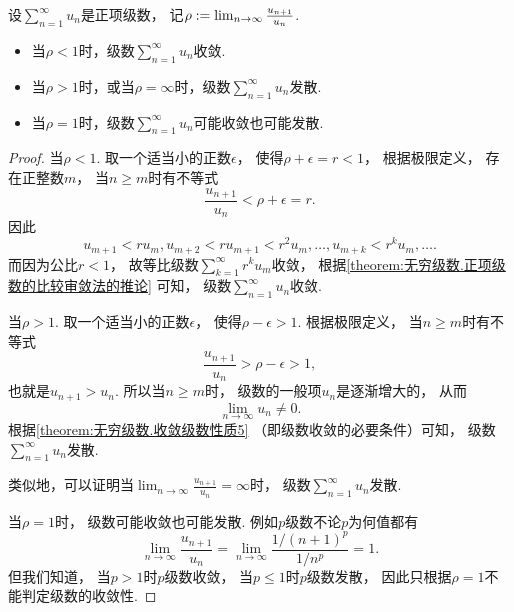 \begin{theorem}\label{theorem:无穷级数.正项级数的比值审敛法}
设\(\sum_{n=1}^\infty u_n\)是正项级数，
记\(\rho := \lim_{n\to\infty} \frac{u_{n+1}}{u_n}\).
\begin{itemize}
	\item 当\(\rho<1\)时，级数\(\sum_{n=1}^\infty u_n\)收敛.
	\item 当\(\rho>1\)时，或当\(\rho=\infty\)时，级数\(\sum_{n=1}^\infty u_n\)发散.
	\item 当\(\rho=1\)时，级数\(\sum_{n=1}^\infty u_n\)可能收敛也可能发散.
\end{itemize}
\begin{proof}
当\(\rho<1\).
取一个适当小的正数\(\epsilon\)，
使得\(\rho+\epsilon=r<1\)，
根据极限定义，
存在正整数\(m\)，
当\(n \geq m\)时有不等式\[
	\frac{u_{n+1}}{u_n} < \rho + \epsilon = r.
\]
因此\[
	u_{m+1} < r u_m,
	u_{m+2} < r u_{m+1} < r^2 u_m,
	\dotsc,
	u_{m+k} < r^k u_m,
	\dotsc.
\]
而因为公比\(r<1\)，
故等比级数\(\sum_{k=1}^\infty r^k u_m\)收敛，
根据\cref{theorem:无穷级数.正项级数的比较审敛法的推论} 可知，
级数\(\sum_{n=1}^\infty u_n\)收敛.

当\(\rho>1\).
取一个适当小的正数\(\epsilon\)，
使得\(\rho-\epsilon>1\).
根据极限定义，
当\(n \geq m\)时有不等式\[
	\frac{u_{n+1}}{u_n} > \rho-\epsilon > 1,
\]
也就是\(u_{n+1}>u_n\).
所以当\(n \geq m\)时，
级数的一般项\(u_n\)是逐渐增大的，
从而\[
	\lim_{n\to\infty} u_n \neq 0.
\]
根据\cref{theorem:无穷级数.收敛级数性质5} （即级数收敛的必要条件）可知，
级数\(\sum_{n=1}^\infty u_n\)发散.

类似地，可以证明当\(\lim_{n\to\infty} \frac{u_{n+1}}{u_n} = \infty\)时，
级数\(\sum_{n=1}^\infty u_n\)发散.

当\(\rho = 1\)时，
级数可能收敛也可能发散.
例如\(p\)级数不论\(p\)为何值都有\[
	\lim_{n\to\infty} \frac{u_{n+1}}{u_n}
	= \lim_{n\to\infty} \frac{1/(n+1)^p}{1/n^p} = 1.
\]
但我们知道，
当\(p>1\)时\(p\)级数收敛，
当\(p\leq1\)时\(p\)级数发散，
因此只根据\(\rho=1\)不能判定级数的收敛性.
\end{proof}
\end{theorem}

